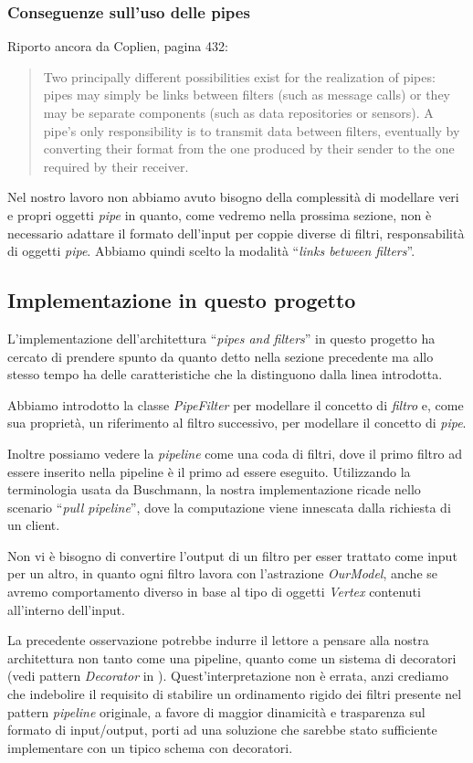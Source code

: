 \subsubsection{Conseguenze sull'uso delle pipes}
Riporto ancora da Coplien, pagina 432:
\begin{quotation}
  Two principally different possibilities exist for the realization of
  pipes: pipes may simply be links between filters (such as message
  calls) or they may be separate components (such as data repositories
  or sensors). A pipe's only responsibility is to transmit data
  between filters, eventually by converting their format from the one
  produced by their sender to the one required by their receiver.
\end{quotation}
Nel nostro lavoro non abbiamo avuto bisogno della complessit\`a di
modellare veri e propri oggetti \emph{pipe} in quanto, come vedremo
nella prossima sezione, non \`e necessario adattare il formato
dell'input per coppie diverse di filtri, responsabilit\`a di oggetti
\emph{pipe}. Abbiamo quindi scelto la modalit\`a ``\emph{links between
  filters}''.

\subsection{Implementazione in questo progetto}
L'implementazione dell'architettura ``\emph{pipes and filters}'' in
questo progetto ha cercato di prendere spunto da quanto detto nella
sezione precedente ma allo stesso tempo ha delle caratteristiche che
la distinguono dalla linea introdotta.

Abbiamo introdotto la classe \emph{PipeFilter} per modellare il
concetto di \emph{filtro} e, come sua propriet\`a, un riferimento al
filtro successivo, per modellare il concetto di \emph{pipe}.

Inoltre possiamo vedere la \emph{pipeline} come una coda di filtri,
dove il primo filtro ad essere inserito nella pipeline \`e il primo ad
essere eseguito. Utilizzando la terminologia usata da Buschmann, la
nostra implementazione ricade nello scenario ``\emph{pull pipeline}'',
dove la computazione viene innescata dalla richiesta di un client.

Non vi \`e bisogno di convertire l'output di un filtro per esser
trattato come input per un altro, in quanto ogni filtro lavora con
l'astrazione \emph{OurModel}, anche se avremo comportamento diverso in
base al tipo di oggetti \emph{Vertex} contenuti all'interno
dell'input.

La precedente osservazione potrebbe indurre il lettore a pensare alla
nostra architettura non tanto come una pipeline, quanto come un
sistema di decoratori (vedi pattern \emph{Decorator} in
\cite{SmalltalkCompanion98}). Quest'interpretazione non \`e errata,
anzi crediamo che indebolire il requisito di stabilire un ordinamento
rigido dei filtri presente nel pattern \emph{pipeline} originale, a
favore di maggior dinamicit\`a e trasparenza sul formato di
input/output, porti ad una soluzione che sarebbe stato sufficiente
implementare con un tipico schema con decoratori.
